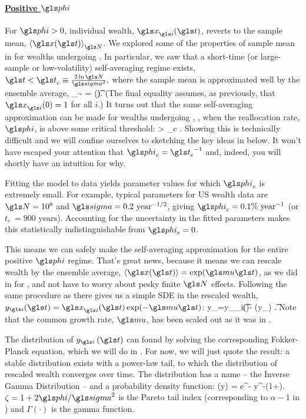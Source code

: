 \paragraph{\underline{Positive $\gphi$}}
\mbox{}

For $\gphi>0$, individual wealth, $\x_\gi(\t)$, reverts to the sample mean, $\ave{\x(\t)}_\N$. We explored some of the properties of sample mean in  for wealths undergoing \GBM. In particular, we saw that a short-time (or large-sample or low-volatility) self-averaging regime exists, 
$\t < \t_c \equiv \frac{2\ln \N}{\gsigma^2},$
where the sample mean is approximated well by the ensemble average,
\be
\ave{\x(\t)}_\N \sim \ave{\x(\t)} = \exp(\gmu \t).
\ee
(The final equality assumes, as previously, that $\x_\gi(0)=1$ for all $i$.) It turns out that the same self-averaging approximation can be made for wealths undergoing \RGBM, , when the reallocation rate, $\gphi$, is above some critical threshold:
\be
\gphi > \gphi_c \equiv {}.
\ee
Showing this is technically difficult \cite{Bouchaud2015b} and we will confine ourselves to sketching the key ideas in  below. It won't have escaped your attention that $\gphi_c={\t_c}^{-1}$ and, indeed, you will shortly have an intuition for why. 

Fitting the model to data yields parameter values for which $\gphi_c$ is extremely small. For example, typical parameters for US wealth data are $\N=10^8$ and $\gsigma=0.2\text{ year}^{-1/2}$, giving $\gphi_c = 0.1\%\text{ year}^{-1}$ (or $t_c\ = 900\text{ years}$). Accounting for the uncertainty in the fitted parameters makes this statistically indistinguishable from $\gphi_c=0$.

This means we can safely make the self-averaging approximation for the entire positive $\gphi$ regime. That's great news, because it means we can rescale wealth by the ensemble average, $\ave{\x(\t)}=\exp(\gmu \t)$, as we did in  for \GBM, and not have to worry about pesky finite $\N$ effects. Following the same procedure as there gives us a simple SDE in the rescaled wealth, $y_\gi(\t) = \x_\gi(\t)\exp(-\gmu \t)$:
\be
\gd y_\gi=y_\gi \gsigma \gd\gW_i\left(\t\right)- \gphi (y_) \gd\t.
\ee
Note that the common growth rate, $\gmu$, has been scaled out as it was in .

The distribution of $y_\gi\left(\t\right)$ can found by solving the corresponding Fokker-Planck equation, which we will do in . For now, we will just quote the result: a stable distribution exists with a power-law tail, to which the distribution of rescaled wealth converges over time. The distribution has a name -- the Inverse Gamma Distribution -- and a probability density function:
\be
{}\left(y\right) = \frac{\left(\zeta-1\right)^\zeta}{\Gamma\left(\zeta\right)} e^{-} y^{-\left(1+\zeta\right)}.
\ee
$\zeta=1+2\gphi/\gsigma^2$ is the Pareto tail index (corresponding to $\alpha-1$ in ) and $\Gamma\left(\cdot\right)$ is the gamma function.

